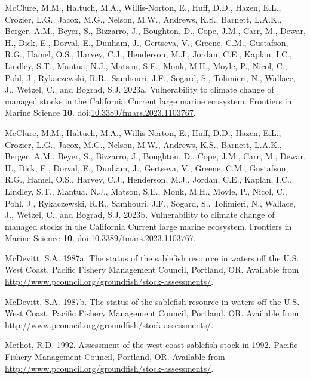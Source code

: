 \documentclass[
  english,
]{article}
\newlength{\cslhangindent}
\newenvironment{CSLReferences}[2] %
 {\begin{list}{}{%
  \setlength{\itemindent}{0pt}
  \setlength{\leftmargin}{0pt}
  \setlength{\parsep}{0pt}
  \ifodd #1
   \setlength{\leftmargin}{\cslhangindent}
   \setlength{\itemindent}{-1\cslhangindent}
  \fi
  \setlength{\itemsep}{#2\baselineskip}}}
 {\end{list}}
\begin{document}
\begin{CSLReferences}{1}{0}
McClure, M.M., Haltuch, M.A., Willis-Norton, E., Huff, D.D., Hazen,
E.L., Crozier, L.G., Jacox, M.G., Nelson, M.W., Andrews, K.S., Barnett,
L.A.K., Berger, A.M., Beyer, S., Bizzarro, J., Boughton, D., Cope, J.M.,
Carr, M., Dewar, H., Dick, E., Dorval, E., Dunham, J., Gertseva, V.,
Greene, C.M., Gustafson, R.G., Hamel, O.S., Harvey, C.J., Henderson,
M.J., Jordan, C.E., Kaplan, I.C., Lindley, S.T., Mantua, N.J., Matson,
S.E., Monk, M.H., Moyle, P., Nicol, C., Pohl, J., Rykaczewski, R.R.,
Samhouri, J.F., Sogard, S., Tolimieri, N., Wallace, J., Wetzel, C., and
Bograd, S.J. 2023a. Vulnerability to climate change of managed stocks in
the {California Current} large marine ecosystem. Frontiers in Marine
Science \textbf{10}.
doi:\href{https://doi.org/10.3389/fmars.2023.1103767}{10.3389/fmars.2023.1103767}.

McClure, M.M., Haltuch, M.A., Willis-Norton, E., Huff, D.D., Hazen,
E.L., Crozier, L.G., Jacox, M.G., Nelson, M.W., Andrews, K.S., Barnett,
L.A.K., Berger, A.M., Beyer, S., Bizzarro, J., Boughton, D., Cope, J.M.,
Carr, M., Dewar, H., Dick, E., Dorval, E., Dunham, J., Gertseva, V.,
Greene, C.M., Gustafson, R.G., Hamel, O.S., Harvey, C.J., Henderson,
M.J., Jordan, C.E., Kaplan, I.C., Lindley, S.T., Mantua, N.J., Matson,
S.E., Monk, M.H., Moyle, P., Nicol, C., Pohl, J., Rykaczewski, R.R.,
Samhouri, J.F., Sogard, S., Tolimieri, N., Wallace, J., Wetzel, C., and
Bograd, S.J. 2023b. Vulnerability to climate change of managed stocks in
the {California Current} large marine ecosystem. Frontiers in Marine
Science \textbf{10}.
doi:\href{https://doi.org/10.3389/fmars.2023.1103767}{10.3389/fmars.2023.1103767}.

McDevitt, S.A. 1987a. The status of the sablefish resource in waters off
the {U}.{S}. {W}est {C}oast. Pacific Fishery Management Council,
Portland, OR. Available from
\url{http://www.pcouncil.org/groundfish/stock-assessments/}.

McDevitt, S.A. 1987b. The status of the sablefish resource in waters off
the {U}.{S}. {W}est {C}oast. Pacific Fishery Management Council,
Portland, OR. Available from
\url{http://www.pcouncil.org/groundfish/stock-assessments/}.

Methot, R.D. 1992. Assessment of the west coast sablefish stock in 1992.
Pacific Fishery Management Council, Portland, OR. Available from
\url{http://www.pcouncil.org/groundfish/stock-assessments/}.


\end{CSLReferences}
\end{document}
